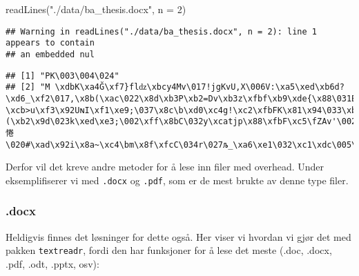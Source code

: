 \documentclass[
]{article}
\newenvironment{Shaded}{\begin{snugshade}}{\end{snugshade}}
\newcommand{\AttributeTok}[1]{\textcolor[rgb]{0.77,0.63,0.00}{#1}}
\newcommand{\DecValTok}[1]{\textcolor[rgb]{0.00,0.00,0.81}{#1}}
\newcommand{\FunctionTok}[1]{\textcolor[rgb]{0.00,0.00,0.00}{#1}}
\newcommand{\NormalTok}[1]{#1}
\newcommand{\StringTok}[1]{\textcolor[rgb]{0.31,0.60,0.02}{#1}}
\begin{document}
\begin{Shaded}
\begin{Highlighting}[]
\FunctionTok{readLines}\NormalTok{(}\StringTok{"./data/ba\_thesis.docx"}\NormalTok{, }\AttributeTok{n =} \DecValTok{2}\NormalTok{)}
\end{Highlighting}
\end{Shaded}

\begin{verbatim}
## Warning in readLines("./data/ba_thesis.docx", n = 2): line 1 appears to contain
## an embedded nul
\end{verbatim}

\begin{verbatim}
## [1] "PK\003\004\024"                                                                                                                                                                                                                                                                                                                                                                                                                                                                                                                                                                                                                                    
## [2] "M \xdbK\xa4Ğ\xf7}flǳ\xbcy4Mv\017!jgKvU,X\006V:\xa5\xed\xb6d?\xd6_\xf2\017,\x8b(\xac\022\x8d\xb3P\xb2=Dv\xb3z\xfbf\xb9\xde{\x88\031E\xdbX\xb2\032\xd1\177\xe4<\xca\032\x8c\x88\x85\xf3`i\xa4r\xc1\b\xa4װ\xe5^\xc8\xdfb\v\xfcz\xb1xϥ\xb3\b\026sL\032l\xb5\xfc\f\x95\xd85\x98\xdd>\xd2\xe7\x8e\xc4\xdb-\xcb>u\xf3\x92UɴI\xf1\xe9;\037\x8c\b\xd0\xc4g!\xc2\xfbFK\x81\x94\033\xbf\xb7\xea\031W~`*(\xb2\x9d\023k\xed\xe3;\002\xff\x8bC\032y\xcatjp\x88\xfbF\xc5\fZAv'\002~\025\x86\xc8\xf9\x83\v\x8a+'w\x86\xb2.\xce\xcb\fp\xba\xaa\xd2\022\xfa\xf8\xa4惓\020#\xad\x92i\x8a~\xc4\bm\x8f\xfcC\034r\027љ_\xa6\xe1\032\xc1\xdc\005\xe7\xe3\xd5l\x9c^4\xe9A@"
\end{verbatim}

Derfor vil det kreve andre metoder for å lese inn filer med overhead.
Under eksemplifiserer vi med \texttt{.docx} og \texttt{.pdf}, som er de
mest brukte av denne type filer.

\hypertarget{docx}{%
\subsubsection{.docx}\label{docx}}

Heldigvis finnes det løsninger for dette også. Her viser vi hvordan vi
gjør det med pakken \texttt{textreadr}, fordi den har funksjoner for å
lese det meste (.doc, .docx, .pdf, .odt, .pptx, osv):
\end{document}
